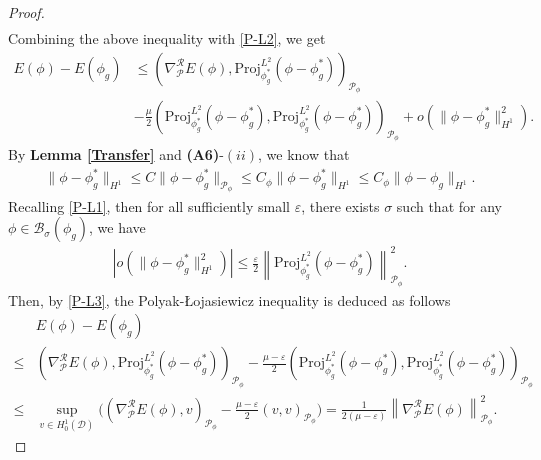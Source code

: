 \documentclass[preprint,3p]{elsarticle}
\begin{document}
\begin{proof}
\begin{align*}
	\end{align*}
	Combining the above inequality with \eqref{P-L2}, we get
	\begin{align}\label{P-L3}
		\nonumber E(\phi)-E(\phi_g)&\le\left(\nabla^{\mathcal{R}}_{\mathcal{P}} E(\phi),\text{Proj}^{L^2}_{\phi_g^*}(\phi-\phi_g^*)\right)_{\mathcal{P}_{\phi}}\\
		&-\frac{\mu}{2}\left(\text{Proj}^{L^2}_{\phi_g^*}(\phi-\phi_g^*),\text{Proj}^{L^2}_{\phi_g^*}(\phi-\phi_g^*)\right)_{\mathcal{P}_{\phi}}+o\left(\|\phi-\phi_g^*\|^2_{H^1}\right).
	\end{align}
	By {\bf Lemma \ref{Transfer}} and {\bf (A6)}-$(ii)$, we know that 
	\begin{align}\label{phi_g^*-phi_g}
		\|\phi-\phi_g^*\|_{{H^1}}\le C\|\phi-\phi_g^*\|_{\mathcal{P}_{\phi}}\le C_{\phi}\|\phi-\phi_g^*\|_{H^1}\le C_{\phi} \|\phi-\phi_g\|_{H^1}. 
	\end{align}
	Recalling \eqref{P-L1}, then for all sufficiently small $\varepsilon$, there exists $\sigma$ such that for any $\phi \in \mathcal{B}_{\sigma}(\phi_g)$, we have
	\begin{align}\label{P-L4}
		\left|o\left(\|\phi-\phi_g^*\|^2_{H^1}\right)\right|\le\frac{\varepsilon}{2}\left\|\text{Proj}^{L^2}_{\phi_g^*}(\phi-\phi_g^*)\right\|^2_{\mathcal{P}_{\phi}}.
	\end{align}
	Then, by \eqref{P-L3}, the Polyak-\L ojasiewicz inequality is deduced as follows
	\begin{align*}
		&E(\phi)-E(\phi_g)\\
		\le&\left(\nabla^{\mathcal{R}}_{\mathcal{P}} E(\phi),\text{Proj}^{L^2}_{\phi_g^*}(\phi-\phi_g^*)\right)_{\mathcal{P}_{\phi}}-\frac{\mu-\varepsilon}{2}\left(\text{Proj}^{L^2}_{\phi_g^*}(\phi-\phi_g^*),\text{Proj}^{L^2}_{\phi_g^*}(\phi-\phi_g^*)\right)_{\mathcal{P}_{\phi}}\\
		\le&\sup\limits_{v\in H_0^1(\mathcal{D})}\Bigg(\left( \nabla^{\mathcal{R}}_{\mathcal{P}} E(\phi),v\right)_{\mathcal{P}_{\phi}}-\frac{\mu-\varepsilon}{2}(v,v)_{\mathcal{P}_{\phi}}\Bigg)
		=\frac{1}{2(\mu-\varepsilon)}\left\|\nabla^{\mathcal{R}}_{\mathcal{P}} E(\phi)\right\|^2_{\mathcal{P}_{\phi}}.
	\end{align*}
\end{proof}
\end{document}
